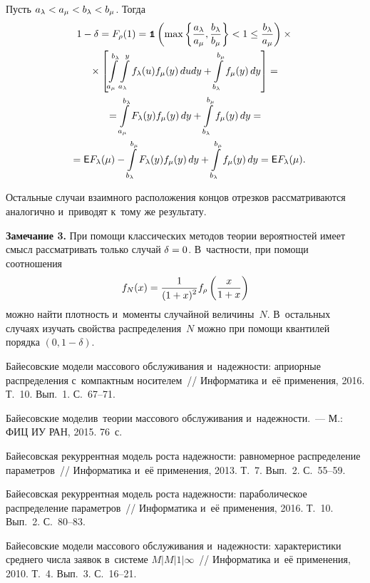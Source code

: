 \begin{multicols}{2}
Пусть $a_\lambda<a_\mu\hm<b_\lambda\hm<b_\mu$. Тогда
\begin{multline*}
1-\delta=F_\rho(1)=
\mbox{{\small \tt {1}}\hspace{-1.3mm}{\tt 1}}\left(\max\left\{\displaystyle\frac{\displaystyle a_\lambda\mathstrut}{\displaystyle a_\mu\mathstrut},\displaystyle\frac{\displaystyle b_\lambda\mathstrut}{\displaystyle b_\mu\mathstrut}\right\}<1\le
\displaystyle\frac{\displaystyle b_\lambda\mathstrut}{\displaystyle a_\mu\mathstrut}\right)\times{}\\
{}\times
\left[ \int\limits_{a_\mu}^{b_\lambda}\int\limits_{a_\lambda}^{y}f_\lambda(u)f_\mu(y)\, dudy+
\int\limits_{b_\lambda}^{b_\mu}f_\mu(y)\, dy\right]={}\\
{}=\int\limits_{a_\mu}^{b_\lambda}F_\lambda(y)f_\mu(y)\, dy+\int\limits_{b_\lambda}^{b_\mu}f_\mu(y)\, dy={}\\
{}={\sf E} F_\lambda(\mu)-\int\limits_{b_\lambda}^{b_\mu}F_\lambda(y)f_\mu(y)\, dy+
\int\limits_{b_\lambda}^{b_\mu}f_\mu(y)\, dy=
{\sf E} F_\lambda(\mu).\hspace*{-5.63pt}
\end{multline*}

Остальные случаи взаимного расположения концов отрезков 
рассматриваются аналогично и~приводят к~тому же результату.

\smallskip

\noindent
\textbf{Замечание 3.} При помощи классических методов теории вероятностей 
имеет смысл рассматривать только случай $\delta\hm=0$. В~частности, при помощи 
соотношения
$$
f_N(x)=\displaystyle\frac{\displaystyle 1\mathstrut}{\displaystyle (1+x)^2\mathstrut}f_\rho\left(\displaystyle\frac{\displaystyle x\mathstrut}{\displaystyle 1+x\mathstrut}\right)
$$
можно найти плотность и~моменты случайной величины~$N$. 
В~остальных случаях изучать свойства распределения~$N$ можно при помощи квантилей 
порядка $(0,1-\delta)$.


{\small\frenchspacing
 {%
 \begin{thebibliography}{9}
Байесовские модели массового обслуживания и~надежности: 
априорные распределения с~компактным носителем~//
Информатика и~её применения, 2016. Т.~10. Вып.~1. С.~67--71.

Байесовские модели\linebreak в~тео\-рии массового обслуживания и~надежности.~--- 
М.: ФИЦ ИУ РАН, 2015. 76~с.

 Байесовская
рекуррентная модель роста надежности: равномерное распределение
параметров~// Информатика и~её применения, 2013. Т.~7. Вып.~2.
С.~55--59.

 Байесовская
рекуррентная модель роста надежности: параболическое распределение
параметров~// Информатика и~её применения, 2016. Т.~10. Вып.~2.
С.~80--83.

 Байесовские модели
массового обслуживания и~надежности: характеристики среднего числа
заявок в~системе $M|M|1|\infty$~// Информатика и~её применения, 2010. 
Т.~4. Вып.~3. С.~16--21.
\end{thebibliography}

 }
 }

\end{multicols}

